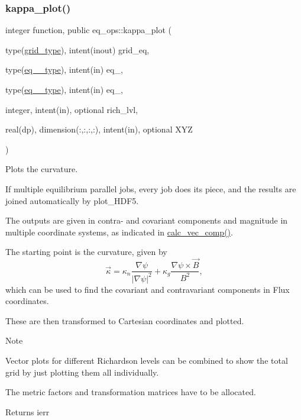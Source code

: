 \subsubsection{\texorpdfstring{kappa\+\_\+plot()}{kappa\_plot()}}
{\footnotesize\ttfamily integer function, public eq\+\_\+ops\+::kappa\+\_\+plot (\begin{DoxyParamCaption}\item[{type(\hyperlink{structgrid__vars_1_1grid__type}{grid\+\_\+type}), intent(inout)}]{grid\+\_\+eq,  }\item[{type(\hyperlink{structeq__vars_1_1eq__1__type}{eq\+\_\+1\+\_\+type}), intent(in)}]{eq\+\_,  }\item[{type(\hyperlink{structeq__vars_1_1eq__2__type}{eq\+\_\+2\+\_\+type}), intent(in)}]{eq\+\_,  }\item[{integer, intent(in), optional}]{rich\+\_\+lvl,  }\item[{real(dp), dimension(\+:,\+:,\+:,\+:), intent(in), optional}]{X\+YZ }\end{DoxyParamCaption})}



Plots the curvature. 

If multiple equilibrium parallel jobs, every job does its piece, and the results are joined automatically by plot\+\_\+\+H\+D\+F5.

The outputs are given in contra-\/ and covariant components and magnitude in multiple coordinate systems, as indicated in \hyperlink{namespacegrid__utilities_ad3d9386b9abcb1a7e17369a1b3a3750d}{calc\+\_\+vec\+\_\+comp()}.

The starting point is the curvature, given by \[\vec{\kappa} = \kappa_n \frac{\nabla \psi}{ \left|\nabla \psi\right|^2 } + \kappa_g \frac{\nabla \psi \times \vec{B}}{B^2} , \] which can be used to find the covariant and contravariant components in Flux coordinates.

These are then transformed to Cartesian coordinates and plotted.

\begin{DoxyNote}{Note}

\begin{DoxyEnumerate}
\item Vector plots for different Richardson levels can be combined to show the total grid by just plotting them all individually.
\item The metric factors and transformation matrices have to be allocated.
\end{DoxyEnumerate}
\end{DoxyNote}
\begin{DoxyReturn}{Returns}
ierr
\end{DoxyReturn}

